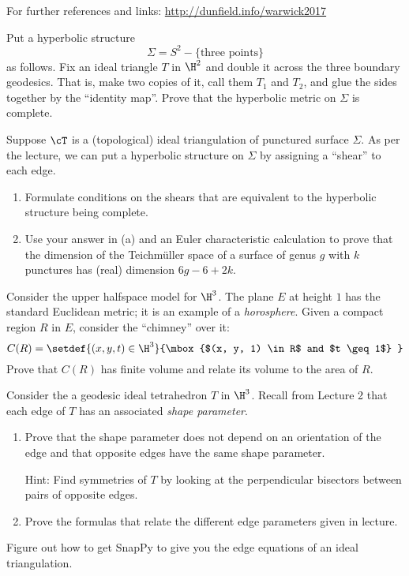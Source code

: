 \documentclass[tikz, a4paper]{nmd/hw}
\begin{document}

For further references and links: \url{http://dunfield.info/warwick2017}

\begin{problems}
\item Put a hyperbolic structure
  \[
    \Sigma = S^2 - \{\mbox{three points}\}
  \]
  as follows.  Fix an ideal triangle $T$ in $\H^2$ and double it
  across the three boundary geodesics.  That is, make two copies of
  it, call them $T_1$ and $T_2$, and glue the sides together by the
  ``identity map''.  Prove that the hyperbolic metric on $\Sigma$ is
  complete.

\item Suppose $\cT$ is a (topological) ideal triangulation of
  punctured surface $\Sigma$.  As per the lecture, we can put a
  hyperbolic structure on $\Sigma$ by assigning a ``shear'' to each
  edge.
  \begin{enumerate}
    \item Formulate conditions on the shears that are equivalent to
      the hyperbolic structure being complete.
    \item Use your answer in (a) and an Euler characteristic
      calculation to prove that the dimension of the
      Teichm\"uller space of a surface of genus $g$ with $k$ punctures
      has (real) dimension $6g - 6 + 2k$.
    \end{enumerate}

  \item Consider the upper halfspace model for $\H^3$.  The plane $E$
    at height $1$ has the standard Euclidean metric; it is an example
    of a \emph{horosphere}.  Given a compact
    region $R$ in $E$, consider the ``chimney'' over it:
    \[
      C(R) = \setdef{ (x, y, t) \in \H^3}{\mbox{$(x, y, 1) \in R$ and
          $t \geq 1$} }
    \]
    Prove that $C(R)$ has finite volume and relate its volume to the
    area of $R$.

  \item Consider the a geodesic ideal tetrahedron $T$ in
    $\H^3$. Recall from Lecture 2 that each edge of $T$ has an
    associated \emph{shape parameter}.
    \begin{enumerate}
    \item Prove that the shape parameter does not depend on an
      orientation of the edge and that opposite edges have the same
      shape parameter.

      Hint: Find symmetries of $T$ by looking at the perpendicular
      bisectors between pairs of opposite edges.

    \item Prove the formulas that relate the different edge parameters
      given in lecture. 
    \end{enumerate}

  \item Figure out how to get SnapPy to give you the edge equations of
    an ideal triangulation.  
    
\end{problems}
\end{document}
